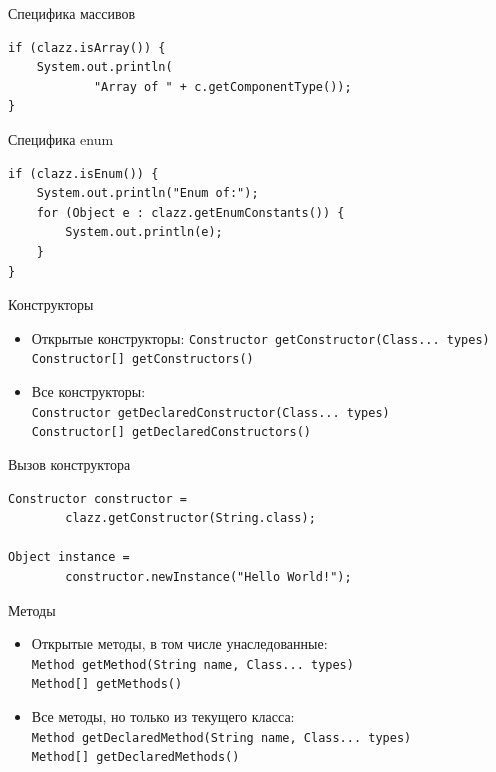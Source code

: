 \documentclass[unicode]{beamer}
\begin{document}
\begin{frame}[fragile]{Специфика массивов}
\begin{lstlisting}
if (clazz.isArray()) {
    System.out.println(
            "Array of " + c.getComponentType());
}
\end{lstlisting}
\end{frame}


\begin{frame}[fragile]{Специфика enum}
\begin{lstlisting}
if (clazz.isEnum()) {
    System.out.println("Enum of:");
    for (Object e : clazz.getEnumConstants()) {
        System.out.println(e);
    }
}
\end{lstlisting}
\end{frame}


\begin{frame}{Конструкторы}
\begin{itemize}
\item Открытые конструкторы:
    \lstinline|Constructor getConstructor(Class... types)|\\
    \lstinline|Constructor[] getConstructors()|
    \bigskip

\item Все конструкторы:\\
    \lstinline|Constructor getDeclaredConstructor(Class... types)|\\
    \lstinline|Constructor[] getDeclaredConstructors()|
\end{itemize}
\end{frame}


\begin{frame}[fragile]{Вызов конструктора}
\begin{lstlisting}
Constructor constructor =
        clazz.getConstructor(String.class);

Object instance =
        constructor.newInstance("Hello World!");
\end{lstlisting}
\end{frame}


\begin{frame}{Методы}
\begin{itemize}
\item Открытые методы, в том числе унаследованные:\\
    \lstinline|Method getMethod(String name, Class... types)|\\
    \lstinline|Method[] getMethods()|
    \bigskip

\item Все методы, но только из текущего класса:\\
    \lstinline|Method getDeclaredMethod(String name, Class... types)|\\
    \lstinline|Method[] getDeclaredMethods()|
\end{itemize}
\end{frame}
\end{document}
